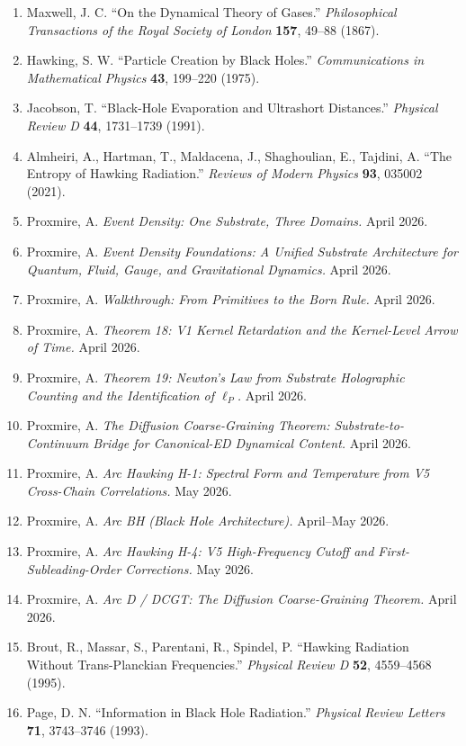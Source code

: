 \documentclass[11pt,a4paper]{article}
\begin{document}
\begin{enumerate}[noitemsep,leftmargin=*]
\item Maxwell, J. C. ``On the Dynamical Theory of Gases.'' \textit{Philosophical Transactions of the Royal Society of London} \textbf{157}, 49--88 (1867).
\item Hawking, S. W. ``Particle Creation by Black Holes.'' \textit{Communications in Mathematical Physics} \textbf{43}, 199--220 (1975).
\item Jacobson, T. ``Black-Hole Evaporation and Ultrashort Distances.'' \textit{Physical Review D} \textbf{44}, 1731--1739 (1991).
\item Almheiri, A., Hartman, T., Maldacena, J., Shaghoulian, E., Tajdini, A. ``The Entropy of Hawking Radiation.'' \textit{Reviews of Modern Physics} \textbf{93}, 035002 (2021).
\item Proxmire, A. \textit{Event Density: One Substrate, Three Domains.} April 2026.
\item Proxmire, A. \textit{Event Density Foundations: A Unified Substrate Architecture for Quantum, Fluid, Gauge, and Gravitational Dynamics.} April 2026.
\item Proxmire, A. \textit{Walkthrough: From Primitives to the Born Rule.} April 2026.
\item Proxmire, A. \textit{Theorem 18: V1 Kernel Retardation and the Kernel-Level Arrow of Time.} April 2026.
\item Proxmire, A. \textit{Theorem 19: Newton's Law from Substrate Holographic Counting and the Identification of $\ell_P$.} April 2026.
\item Proxmire, A. \textit{The Diffusion Coarse-Graining Theorem: Substrate-to-Continuum Bridge for Canonical-ED Dynamical Content.} April 2026.
\item Proxmire, A. \textit{Arc Hawking H-1: Spectral Form and Temperature from V5 Cross-Chain Correlations.} May 2026.
\item Proxmire, A. \textit{Arc BH (Black Hole Architecture).} April--May 2026.
\item Proxmire, A. \textit{Arc Hawking H-4: V5 High-Frequency Cutoff and First-Subleading-Order Corrections.} May 2026.
\item Proxmire, A. \textit{Arc D / DCGT: The Diffusion Coarse-Graining Theorem.} April 2026.
\item Brout, R., Massar, S., Parentani, R., Spindel, P. ``Hawking Radiation Without Trans-Planckian Frequencies.'' \textit{Physical Review D} \textbf{52}, 4559--4568 (1995).
\item Page, D. N. ``Information in Black Hole Radiation.'' \textit{Physical Review Letters} \textbf{71}, 3743--3746 (1993).

\end{enumerate}
\end{document}
